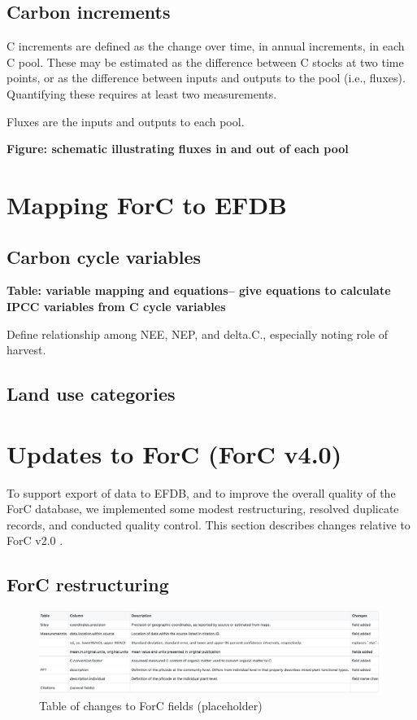 \documentclass[, manuscript]{copernicus}
\begin{document}
\subsection{Carbon increments}

C increments are defined as the change over time, in annual increments,
in each C pool. These may be estimated as the difference between C
stocks at two time points, or as the difference between inputs and
outputs to the pool (i.e., fluxes). Quantifying these requires at least
two measurements.

Fluxes are the inputs and outputs to each pool.

\textbf{Figure: schematic illustrating fluxes in and out of each pool}

\section{Mapping ForC to EFDB}

\subsection{Carbon cycle variables}

\textbf{Table: variable mapping and equations-- give equations to
calculate IPCC variables from C cycle variables}

Define relationship among NEE, NEP, and delta.C., especially noting role
of harvest.

\subsection{Land use categories}

\section{Updates to ForC (ForC v4.0)}

To support export of data to EFDB, and to improve the overall quality of
the ForC database, we implemented some modest restructuring, resolved
duplicate records, and conducted quality control. This section describes
changes relative to ForC v2.0 \citep{anderson-teixeira_forc_2018}.

\subsection{ForC restructuring}

\begin{figure}[H]
\includegraphics[width=12cm]{figures_tables/ForC_updates_placeholder_fig} \caption{Table of changes to ForC fields (placeholder) }\label{fig:unnamed-chunk-2}
\end{figure}
\end{document}
